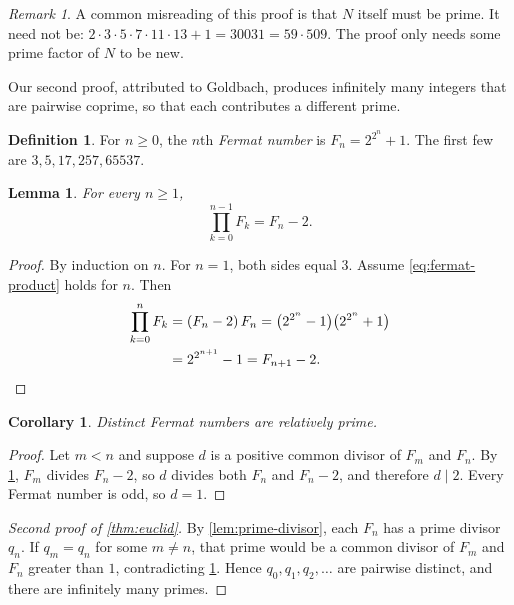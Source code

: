 \documentclass[11pt]{article}
\theoremstyle{plain}
\newtheorem{lemma}[theorem]{Lemma}
\newtheorem{corollary}[theorem]{Corollary}
\theoremstyle{definition}
\newtheorem{definition}[theorem]{Definition}
\theoremstyle{remark}
\newtheorem{remark}[theorem]{Remark}
\begin{document}
\begin{remark}
A common misreading of this proof is that $N$ itself must be prime. It need not be: $2 \cdot 3 \cdot 5 \cdot 7 \cdot 11 \cdot 13 + 1 = 30031 = 59 \cdot 509$. The proof only needs some prime factor of $N$ to be new.
\end{remark}

Our second proof, attributed to Goldbach, produces infinitely many integers that are pairwise coprime, so that each contributes a different prime.

\begin{definition}
For $n \ge 0$, the $n$th \emph{Fermat number} is $F_n = 2^{2^n} + 1$. The first few are $3, 5, 17, 257, 65537$.
\end{definition}

\begin{lemma}
\label{lem:fermat-product}
For every $n \ge 1$,
\begin{equation}
  \prod_{k=0}^{n-1} F_k = F_n - 2.
  \label{eq:fermat-product}
\end{equation}
\end{lemma}

\begin{proof}
By induction on $n$. For $n = 1$, both sides equal $3$. Assume \eqref{eq:fermat-product} holds for $n$. Then
\begin{align*}
  \prod_{k=0}^{n} F_k
    &= (F_n - 2)\,F_n
     = \bigl(2^{2^n} - 1\bigr)\bigl(2^{2^n} + 1\bigr) \\
    &= 2^{2^{n+1}} - 1
     = F_{n+1} - 2. \qedhere
\end{align*}
\end{proof}

\begin{corollary}
\label{cor:fermat-coprime}
Distinct Fermat numbers are relatively prime.
\end{corollary}

\begin{proof}
Let $m < n$ and suppose $d$ is a positive common divisor of $F_m$ and $F_n$. By \cref{lem:fermat-product}, $F_m$ divides $F_n - 2$, so $d$ divides both $F_n$ and $F_n - 2$, and therefore $d \mid 2$. Every Fermat number is odd, so $d = 1$.
\end{proof}

\begin{proof}[Second proof of \cref{thm:euclid}]
By \cref{lem:prime-divisor}, each $F_n$ has a prime divisor $q_n$. If $q_m = q_n$ for some $m \ne n$, that prime would be a common divisor of $F_m$ and $F_n$ greater than $1$, contradicting \cref{cor:fermat-coprime}. Hence $q_0, q_1, q_2, \dots$ are pairwise distinct, and there are infinitely many primes.
\end{proof}
\end{document}
